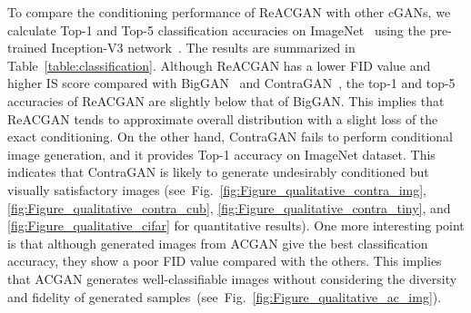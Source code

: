 \documentclass{article}
\begin{document}
\begin{table}[h!]
\centering
\caption{Top-1 and Top-5 ImageNet classification accuracies on generated images from ACGAN~\cite{Odena2017ConditionalIS}, BigGAN~\cite{Brock2019LargeSG}, ContraGAN~\cite{kang2020contragan}, and ReACGAN~(ours). We use ImageNet pre-trained Inception-V3 model~\cite{Szegedy2016RethinkingTI} as a classifier. To generate images from GANs, we use the best checkpoints saved during 200k generator updates.} 
\vspace{2mm}
\label{table:classification}
\end{table} 
To compare the conditioning performance of ReACGAN with other cGANs, we calculate Top-1 and Top-5 classification accuracies on ImageNet~\cite{Deng2009ImageNetAL} using the pre-trained Inception-V3 network~\cite{Szegedy2016RethinkingTI}. The results are summarized in Table~\ref{table:classification}. Although ReACGAN has a lower FID value and higher IS score compared with BigGAN~\cite{Brock2019LargeSG} and ContraGAN~\cite{kang2020contragan}, the top-1 and top-5 accuracies of ReACGAN are slightly below that of BigGAN. This implies that ReACGAN tends to approximate overall distribution with a slight loss of the exact conditioning. On the other hand, ContraGAN fails to perform conditional image generation, and it provides  Top-1 accuracy on ImageNet dataset. This indicates that ContraGAN is likely to generate undesirably conditioned but visually satisfactory images (see~Fig.~\ref{fig:Figure_qualitative_contra_img}, \ref{fig:Figure_qualitative_contra_cub}, \ref{fig:Figure_qualitative_contra_tiny}, and \ref{fig:Figure_qualitative_cifar} for quantitative results). One more interesting point is that although generated images from ACGAN give the best classification accuracy, they show a poor FID value compared with the others. This implies that ACGAN generates well-classifiable images without considering the diversity and fidelity of generated samples~(see~Fig.~\ref{fig:Figure_qualitative_ac_img}). \clearpage
\end{document}
